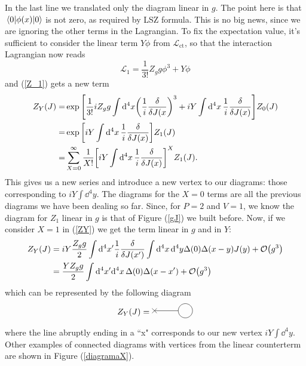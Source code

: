 In the last line we translated only the diagram linear in $g$. The point here is that $\vev{\phi(x)}$ is not zero, as  required by LSZ formula. This is no big news, since we are ignoring the other terms in the Lagrangian. To fix the expectation value, it's sufficient to consider the linear term $Y\phi$ from $\mathcal{L}_{\text{ct}}$, so that the interaction Lagrangian now reads
\begin{equation}
    \mathcal{L}_1=\frac{1}{3!}Z_gg\phi^3+Y\phi
\end{equation}
and (\ref{Z_1}) gets a new term
\begin{equation}
\begin{aligned}
        Z_Y(J)=&\exp\qty[\frac{1}{3!}iZ_gg\int\dd^4x\qty(\frac{1}{i}\fdv{J(x})^3+iY\int\dd^4x\, \frac{1}{i}\fdv{J(x)}]Z_0(J)\\
        =&\exp\qty[iY\int\dd^4x\, \frac{1}{i}\fdv{J(x)}]Z_1(J)\\
        =&\sum_{X=0}^\infty\frac{1}{X!}\qty[iY\int\dd^4x\, \frac{1}{i}\fdv{J(x)}]^XZ_1(J).
\end{aligned}
\label{ZY}
\end{equation}
This gives us a new series and introduce a new vertex to our diagrams: those corresponding to $iY\int\dd^4y$. The diagrams for the $X=0$ terms are all the previous diagrams we have been dealing so far. Since, for $P=2$ and $V=1$, we know the diagram for $Z_1$ linear in $g$ is that of Figure (\ref{gJ}) we built before. Now, if we consider $X=1$ in (\ref{ZY}) we get the term linear in $g$ and in $Y$:
\begin{equation}
\begin{aligned}
   Z_Y(J)&=iY \frac{Z_gg}{2}\int\dd^4x^\prime\frac{1}{i}\fdv{J(x^\prime)}
   \int\dd^4x\,\dd^4y\Delta(0)\Delta(x-y)J(y)+\order{g^3}\\
   &= \frac{YZ_gg}{2}\int\dd^4x^\prime
   \dd^4x\,\Delta(0)\Delta(x-x^\prime)+\order{g^3}
\end{aligned}
\end{equation}
which can be represented by the following diagram
\begin{equation}
    Z_Y(J)=
    \begin{gathered}
        \begin{tikzpicture}
        \draw (0,0) -- (1,0);
        \draw (-0.1,-0.1) -- (0.1,0.1);
        \draw (-0.1,0.1) -- (0.1,-0.1);
        \draw (1.3,0) circle [radius=0.3cm];
        \end{tikzpicture}
        \end{gathered}
        \label{tadpole}
\end{equation}
where the line abruptly ending in a ``x" corresponds to our new vertex $iY\int\dd^4 y$. Other examples of connected diagrams with vertices from the linear counterterm are shown in Figure (\ref{diagramaX}).\\

